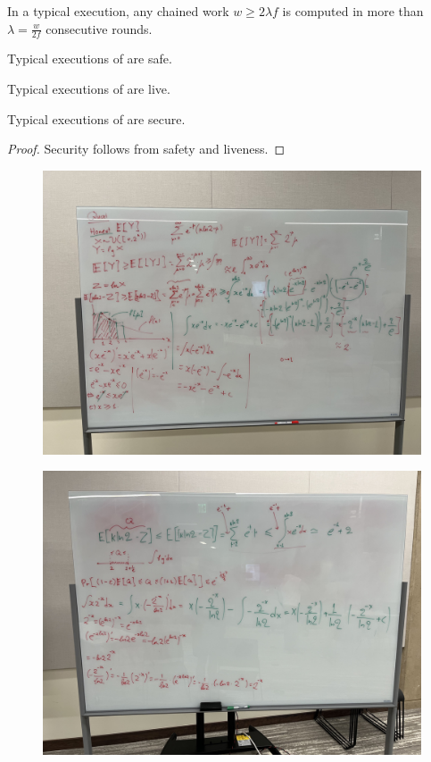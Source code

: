 

\begin{conjecture} \label{lem:patience}
  In a typical execution, any chained work $w \geq 2 \lambda f$ is computed
  in more than $\lambda = \frac{w}{2 f}$ consecutive rounds.
\end{conjecture}

\begin{conjecture}
  Typical executions of \poem are safe.
\end{conjecture}

\begin{conjecture}
  Typical executions of \poem are live.
\end{conjecture}

\begin{corollary}
  Typical executions of \poem are secure.
\end{corollary}
\begin{proof}
  Security follows from safety and liveness.
  \Qed
\end{proof}

\begin{figure}[h]
    \centering
    \includegraphics[width=1\textwidth]{figures/bounds-1.jpeg}
\end{figure}

\begin{figure}[h]
    \centering
    \includegraphics[width=1\textwidth]{figures/bounds-2.jpeg}
\end{figure}
